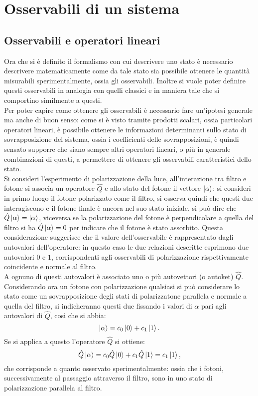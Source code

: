 \section{Osservabili di un sistema}
\subsection{Osservabili e operatori lineari}
Ora che si è definito il formalismo con cui descrivere uno stato è necessario descrivere matematicamente come da tale stato sia possibile ottenere le quantità misurabili sperimentalmente, ossia gli osservabili. Inoltre si vuole poter definire questi osservabili in analogia con quelli classici e in maniera tale che si comportino similmente a questi. \\Per poter capire come ottenere gli osservabili è necessario fare un'ipotesi generale ma anche di buon senso: come si è visto tramite prodotti scalari, ossia particolari operatori lineari, è possibile ottenere le informazioni determinanti sullo stato di sovrapposizione del sistema, ossia i coefficienti delle sovrapposizioni, è quindi sensato supporre che siano sempre altri operatori lineari, o più in generale combinazioni di questi, a permettere di ottenere gli osservabili caratteristici dello stato.\\ 

Si consideri l'esperimento di polarizzazione della luce, all'interazione tra filtro e fotone si associa un operatore $\hat Q$ e allo stato del fotone il vettore $\ket{\alpha}$: si consideri in primo luogo il fotone polarizzato come il filtro, si osserva quindi che questi due interagiscono e il fotone finale è ancora nel suo stato iniziale, si può dire che $\hat Q\ket{\alpha}=\ket\alpha$, viceversa se la polarizzazione del fotone è perpendicolare a quella del filtro si ha $\hat Q\ket{\alpha}=0$ per indicare che il fotone è stato assorbito. Questa considerazione suggerisce che il valore dell'osservabile è rappresentato dagli autovalori dell'operatore: in questo caso le due relazioni descritte esprimono due autovalori $0$ e $1$, corrispondenti agli osservabili di polarizzazione rispettivamente coincidente e normale al filtro.\\ A ognuno di questi autovalori è associato uno o più autovettori (o autoket) $\hat Q$.\\
Considerando ora un fotone con polarizzazione qualsiasi si può considerare lo stato come un sovrapposizione degli stati di polarizzatone parallela e normale a quella del filtro, si indicheranno questi due fissando i valori di $\alpha$ pari agli autovalori di $\hat Q$, così che si abbia:
\begin{equation*}
    \ket{\alpha}=c_0\ket{0}+c_1\ket{1}.
\end{equation*}
Se si applica a questo l'operatore $\hat Q$ si ottiene:
\begin{equation*}
    \hat Q\ket{\alpha}=c_0\hat Q\ket{0}+c_1\hat Q\ket{1}=c_1\ket{1},
\end{equation*}
che corrisponde a quanto osservato sperimentalmente: ossia che i fotoni, successivamente al passaggio attraverso il filtro, sono in uno stato di polarizzazione parallela al filtro.
